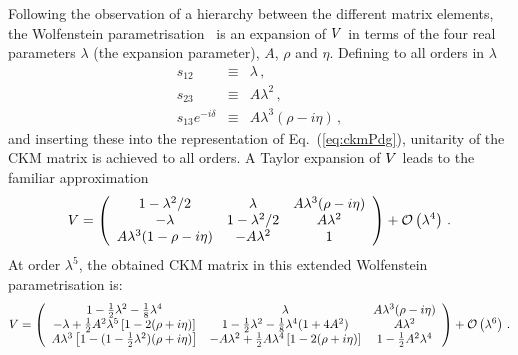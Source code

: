 Following the observation of a hierarchy between the different
matrix elements, the Wolfenstein parametrisation~\cite{Wolfenstein:1983yz}
is an expansion of ${V}$ in terms of the four real parameters $\lambda$
(the expansion parameter), $A$, $\rho$ and $\eta$. Defining to 
all orders in $\lambda$~\cite{Buras:1994ec}
\begin{eqnarray}
  \label{eq:burasdef}
  s_{12}             &\equiv& \lambda\,,\nonumber \\ 
  s_{23}             &\equiv& A\lambda^2\,, \\
  s_{13}e^{-i\delta} &\equiv& A\lambda^3(\rho -i\eta)\,,\nonumber
\end{eqnarray}
and inserting these into the representation of Eq.~(\ref{eq:ckmPdg}), 
unitarity of the CKM matrix is achieved to all orders.
A Taylor expansion of ${V}$ leads to the familiar approximation
\begin{equation}
  \label{eq:cp_uta:ckm}
  {V}
  = 
  \left(
    \begin{array}{ccc}
      1 - \lambda^2/2 & \lambda & A \lambda^3 ( \rho - i \eta ) \\
      - \lambda & 1 - \lambda^2/2 & A \lambda^2 \\
      A \lambda^3 ( 1 - \rho - i \eta ) & - A \lambda^2 & 1 \\
    \end{array}
  \right) + {\cal O}\left( \lambda^4 \right) \, .
\end{equation}
At order $\lambda^{5}$, the obtained CKM matrix in this extended
Wolfenstein parametrisation is:
{\small
  \begin{equation}
    \label{eq:cp_uta:ckm_lambda5}
    {V}
    =
    \left(
      \begin{array}{ccc}
        1 - \frac{1}{2}\lambda^{2} - \frac{1}{8}\lambda^4 &
        \lambda &
        A \lambda^{3} (\rho - i \eta) \\
        - \lambda + \frac{1}{2} A^2 \lambda^5 \left[ 1 - 2 (\rho + i \eta) \right] &
        1 - \frac{1}{2}\lambda^{2} - \frac{1}{8}\lambda^4 (1+4A^2) &
        A \lambda^{2} \\
        A \lambda^{3} \left[ 1 - (1-\frac{1}{2}\lambda^2)(\rho + i \eta) \right] &
        -A \lambda^{2} + \frac{1}{2}A\lambda^4 \left[ 1 - 2(\rho + i \eta) \right] &
        1 - \frac{1}{2}A^2 \lambda^4
      \end{array} 
    \right) + {\cal O}\left( \lambda^{6} \right)\,.
  \end{equation}
}

